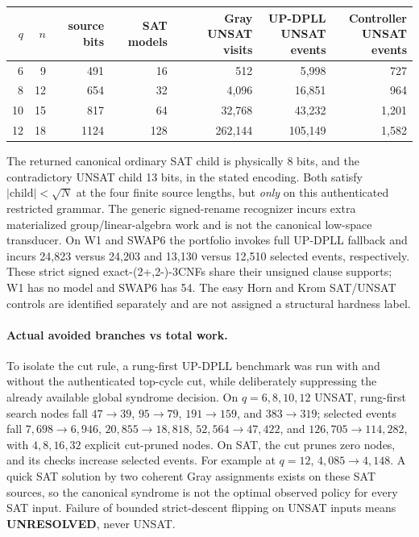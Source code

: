\documentclass[11pt]{article}
\begin{document}
\begin{center}\small
\begin{tabular}{rrrrrrr}
\toprule
$q$ & $n$ & source bits & SAT models & Gray UNSAT visits & \shortstack{UP-DPLL\\UNSAT events} & \shortstack{Controller\\UNSAT events}\\\midrule
6&9&491&16&512&5,998&727\\
8&12&654&32&4,096&16,851&964\\
10&15&817&64&32,768&43,232&1,201\\
12&18&1124&128&262,144&105,149&1,582\\\bottomrule
\end{tabular}
\end{center}
The returned canonical ordinary SAT child is physically 8 bits, and the contradictory UNSAT child 13 bits, in the stated encoding. Both satisfy $|\mathrm{child}|<\sqrt N$ at the four finite source lengths, but \emph{only} on this authenticated restricted grammar. The generic signed-rename recognizer incurs extra materialized group/linear-algebra work and is not the canonical low-space transducer. On W1 and SWAP6 the portfolio invokes full UP-DPLL fallback and incurs 24,823 versus 24,203 and 13,130 versus 12,510 selected events, respectively. These strict signed exact-(2+,2-)-3CNFs share their unsigned clause supports; W1 has no model and SWAP6 has 54. The easy Horn and Krom SAT/UNSAT controls are identified separately and are not assigned a structural hardness label.

\paragraph{Actual avoided branches vs total work.}
To isolate the cut rule, a rung-first UP-DPLL benchmark was run with and without the authenticated top-cycle cut, while deliberately suppressing the already available global syndrome decision. On $q=6,8,10,12$ UNSAT, rung-first search nodes fall $47\to39$, $95\to79$, $191\to159$, and $383\to319$; selected events fall $7,698\to6,946$, $20,855\to18,818$, $52,564\to47,422$, and $126,705\to114,282$, with $4,8,16,32$ explicit cut-pruned nodes. On SAT, the cut prunes zero nodes, and its checks increase selected events. For example at $q=12$, $4,085\to4,148$. A quick SAT solution by two coherent Gray assignments exists on these SAT sources, so the canonical syndrome is not the optimal observed policy for every SAT input. Failure of bounded strict-descent flipping on UNSAT inputs means \textbf{UNRESOLVED}, never UNSAT.
\end{document}
